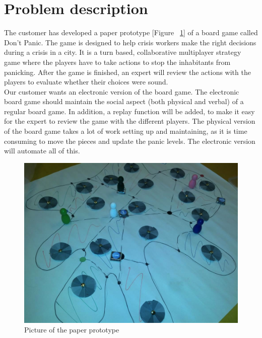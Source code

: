 \section{Problem description} 

The customer has developed a paper prototype [Figure ~\ref{fig:paperPrototype}] 
of a board game called Don’t Panic. The game is designed to help crisis workers 
make the right decisions during a crisis in a city. It is a turn based, 
collaborative multiplayer strategy game where the players have to take actions to stop the 
inhabitants from panicking. After the game is finished, an expert will review 
the actions with the players to evaluate whether their choices were sound. 
\\
Our customer wants an electronic version of the board game. The electronic 
board game should maintain the social aspect (both physical and verbal) of a 
regular board game. In addition, a replay function will be added, to make it 
easy for the expert to review the game with the different players. The 
physical version of the board game takes a lot of work setting up and 
maintaining, as it is time consuming to move the pieces and update the panic 
levels. The electronic version will automate all of this.
\\

\begin{figure}[H]
  \centering
    \includegraphics[width=1.0\textwidth]{img/paper_prototype}
  \caption{Picture of the paper prototype} 
  \label{fig:paperPrototype}
\end{figure}


